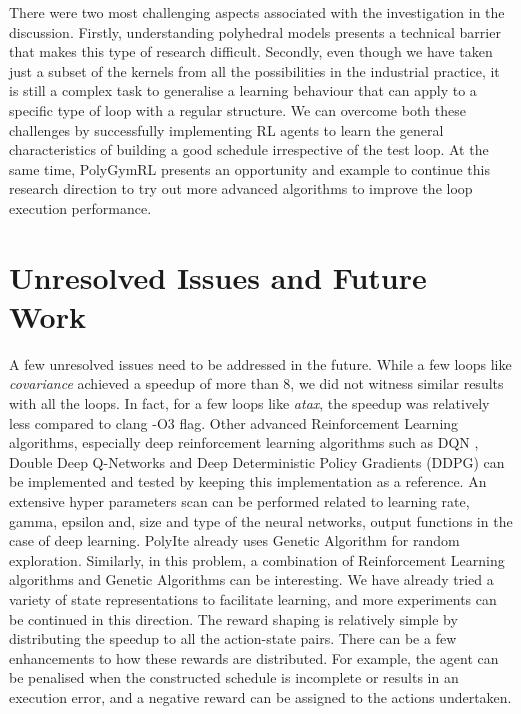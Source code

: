 \documentclass[logo,msc]{infthesis}           %
\begin{document}
There were two most challenging aspects associated with the investigation in the discussion. Firstly, understanding polyhedral models presents a technical barrier that makes this type of research difficult. Secondly, even though we have taken just a subset of the kernels from all the possibilities in the industrial practice, it is still a complex task to generalise a learning behaviour that can apply to a specific type of loop with a regular structure. We can overcome both these challenges by successfully implementing RL agents to learn the general characteristics of building a good schedule irrespective of the test loop. At the same time, PolyGymRL presents an opportunity and example to continue this research direction to try out more advanced algorithms to improve the loop execution performance.

\section{Unresolved Issues and Future Work}

A few unresolved issues need to be addressed in the future. While a few loops like \textit{covariance} achieved a speedup of more than 8, we did not witness similar results with all the loops. In fact, for a few loops like \textit{atax}, the speedup was relatively less compared to clang -O3 flag. Other advanced Reinforcement Learning algorithms, especially deep reinforcement learning algorithms such as DQN \cite{DBLP:journals/corr/MnihKSGAWR13}, Double Deep Q-Networks \cite{DDQN} and Deep Deterministic Policy Gradients (DDPG) \cite{BHATNAGAR20092471} can be implemented and tested by keeping this implementation as a reference. An extensive hyper parameters scan can be performed related to learning rate, gamma, epsilon and, size and type of the neural networks, output functions in the case of deep learning. PolyIte already uses Genetic Algorithm for random exploration.
Similarly, in this problem, a combination of Reinforcement Learning algorithms and Genetic Algorithms\cite{GA} can be interesting. We have already tried a variety of state representations to facilitate learning, and more experiments can be continued in this direction. The reward shaping is relatively simple by distributing the speedup to all the action-state pairs. There can be a few enhancements to how these rewards are distributed. For example, the agent can be penalised when the constructed schedule is incomplete or results in an execution error, and a negative reward can be assigned to the actions undertaken.
\end{document}
